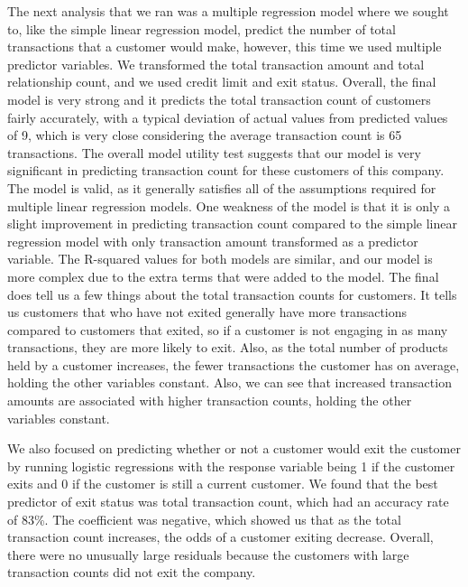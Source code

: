 \documentclass[
]{article}
\begin{document}
The next analysis that we ran was a multiple regression model where we
sought to, like the simple linear regression model, predict the number
of total transactions that a customer would make, however, this time we
used multiple predictor variables. We transformed the total transaction
amount and total relationship count, and we used credit limit and exit
status. Overall, the final model is very strong and it predicts the
total transaction count of customers fairly accurately, with a typical
deviation of actual values from predicted values of 9, which is very
close considering the average transaction count is 65 transactions. The
overall model utility test suggests that our model is very significant
in predicting transaction count for these customers of this company. The
model is valid, as it generally satisfies all of the assumptions
required for multiple linear regression models. One weakness of the
model is that it is only a slight improvement in predicting transaction
count compared to the simple linear regression model with only
transaction amount transformed as a predictor variable. The R-squared
values for both models are similar, and our model is more complex due to
the extra terms that were added to the model. The final does tell us a
few things about the total transaction counts for customers. It tells us
customers that who have not exited generally have more transactions
compared to customers that exited, so if a customer is not engaging in
as many transactions, they are more likely to exit. Also, as the total
number of products held by a customer increases, the fewer transactions
the customer has on average, holding the other variables constant. Also,
we can see that increased transaction amounts are associated with higher
transaction counts, holding the other variables constant.

We also focused on predicting whether or not a customer would exit the
customer by running logistic regressions with the response variable
being 1 if the customer exits and 0 if the customer is still a current
customer. We found that the best predictor of exit status was total
transaction count, which had an accuracy rate of 83\%. The coefficient
was negative, which showed us that as the total transaction count
increases, the odds of a customer exiting decrease. Overall, there were
no unusually large residuals because the customers with large
transaction counts did not exit the company.
\end{document}

